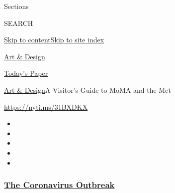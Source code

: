 Sections

SEARCH

\protect\hyperlink{site-content}{Skip to
content}\protect\hyperlink{site-index}{Skip to site index}

\href{https://www.nytimes3xbfgragh.onion/section/arts/design}{Art \&
Design}

\href{https://myaccount.nytimes3xbfgragh.onion/auth/login?response_type=cookie\&client_id=vi}{}

\href{https://www.nytimes3xbfgragh.onion/section/todayspaper}{Today's
Paper}

\href{/section/arts/design}{Art \& Design}\textbar{}A Visitor's Guide to
MoMA and the Met

\url{https://nyti.ms/31BXDKX}

\begin{itemize}
\item
\item
\item
\item
\item
\end{itemize}

\hypertarget{the-coronavirus-outbreak}{%
\subsubsection{\texorpdfstring{\href{https://www.nytimes3xbfgragh.onion/news-event/coronavirus?name=styln-coronavirus-national\&region=TOP_BANNER\&block=storyline_menu_recirc\&action=click\&pgtype=Article\&impression_id=0c412b20-f27e-11ea-b9bc-3185cbd6b8a2\&variant=undefined}{The
Coronavirus
Outbreak}}{The Coronavirus Outbreak}}\label{the-coronavirus-outbreak}}

